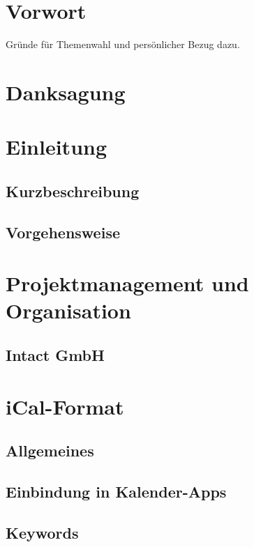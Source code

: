 \documentclass[11pt]{scrartcl}
\begin{document}
\section*{Vorwort}
\label{sec:vorwort}
Gründe für Themenwahl und persönlicher Bezug dazu.

\newpage
	\tableofcontents
\newpage

\section*{Danksagung}
\label{sec:danksagung}


\section{Einleitung}
\label{sec:einleitung}
\subsection{Kurzbeschreibung}
\label{sec:kurzbeschreibung}
\subsection{Vorgehensweise}
\label{sec:vorgehensweise}

\section{Projektmanagement und Organisation}
\label{sec:projektmanagement-und-organisation}

\subsection{Intact GmbH}
\label{sec:intact-gmbh}

\section{iCal-Format}
\label{sec:ical-format}
\subsection{Allgemeines}
\label{sec:ical-allgemeines}
\subsection{Einbindung in Kalender-Apps}
\label{sec:ical-einbindung-in-kalenderapps}
\subsection{Keywords}
\label{sec:ical-keywords}
\end{document}
